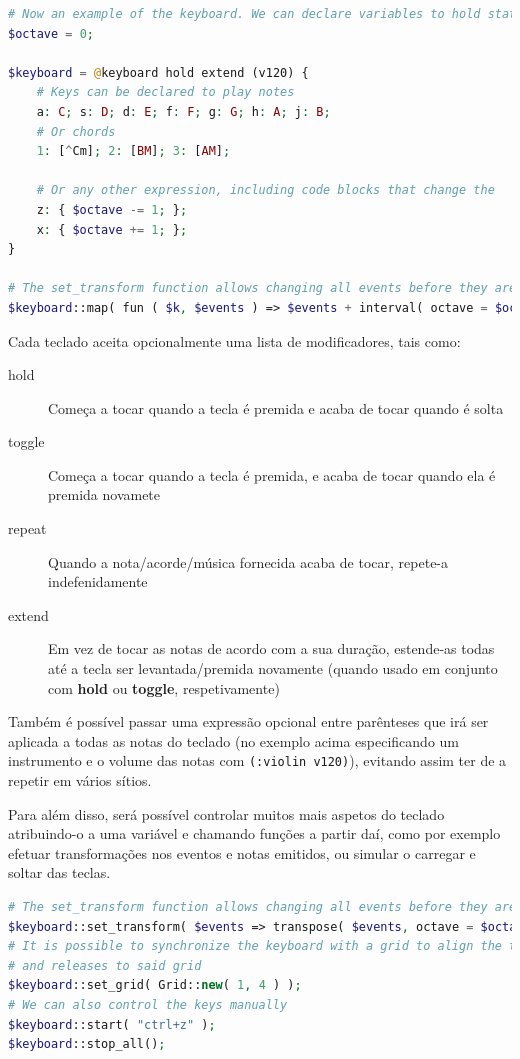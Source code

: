 \begin{lstlisting}[caption=Exemplo da sintaxe de teclados virtuais,language=PHP]
# Now an example of the keyboard. We can declare variables to hold state
$octave = 0;

$keyboard = @keyboard hold extend (v120) {
    # Keys can be declared to play notes
    a: C; s: D; d: E; f: F; g: G; h: A; j: B;
    # Or chords
    1: [^Cm]; 2: [BM]; 3: [AM];
    
    # Or any other expression, including code blocks that change the    state
    z: { $octave -= 1; };
    x: { $octave += 1; };
}

# The set_transform function allows changing all events before they are emitted by this keyboard
$keyboard::map( fun ( $k, $events ) => $events + interval( octave = $octave ) );
\end{lstlisting}

Cada\label{modifiers} teclado aceita opcionalmente uma lista de modificadores, tais como:
\begin{description}
    \item[hold] Começa a tocar quando a tecla é premida e acaba de tocar quando é solta
    \item[toggle] Começa a tocar quando a tecla é premida, e acaba de tocar quando ela é premida novamete
    \item[repeat] Quando a nota/acorde/música fornecida acaba de tocar, repete-a indefenidamente
    \item[extend] Em vez de tocar as notas de acordo com a sua duração, estende-as todas até a tecla ser levantada/premida novamente (quando usado em conjunto com \textbf{hold} ou \textbf{toggle}, respetivamente)
\end{description}

Também é possível passar uma expressão opcional entre parênteses que irá ser aplicada a todas as notas do teclado (no exemplo acima especificando um instrumento e o volume das notas com \texttt{(:violin v120)}), evitando assim ter de a repetir em vários sítios.

Para além disso, será possível controlar muitos mais aspetos do teclado atribuindo-o a uma variável e chamando funções a partir daí, como por exemplo efetuar transformações nos eventos e notas emitidos, ou simular o carregar e soltar das teclas.

\begin{lstlisting}[caption=Exemplo da sintaxe proposta da linguagem,language=PHP]
# The set_transform function allows changing all events before they are emitted by this keyboard
$keyboard::set_transform( $events => transpose( $events, octave = $octave ) );
# It is possible to synchronize the keyboard with a grid to align the timings of key presses 
# and releases to said grid
$keyboard::set_grid( Grid::new( 1, 4 ) );
# We can also control the keys manually
$keyboard::start( "ctrl+z" );
$keyboard::stop_all();

\end{lstlisting}

